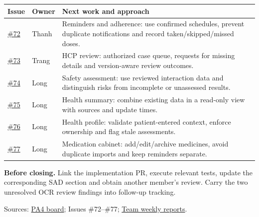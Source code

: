 \documentclass[14pt,a4paper,landscape]{extarticle}
\newcommand{\weekly}{\href{https://docs.google.com/document/d/1hL1-R4h-wUWRMYfatBCGNO-6FeTvV1qBhrAj1i1jbPk/edit}{Team weekly reports}}
\begin{document}
\begin{tabularx}{\linewidth}{@{}p{17mm}p{24mm}X@{}}\toprule
\textbf{Issue} & \textbf{Owner} & \textbf{Next work and approach}\\\midrule
\href{https://github.com/hyt2434/Medical_Safety_Assistant/issues/72}{\#72} & Thanh & Reminders and adherence: use confirmed schedules, prevent duplicate notifications and record taken/skipped/missed doses.\\
\href{https://github.com/hyt2434/Medical_Safety_Assistant/issues/73}{\#73} & Trang & HCP review: authorized case queue, requests for missing details and version-aware review outcomes.\\
\href{https://github.com/hyt2434/Medical_Safety_Assistant/issues/74}{\#74} & Long & Safety assessment: use reviewed interaction data and distinguish risks from incomplete or unassessed results.\\
\href{https://github.com/hyt2434/Medical_Safety_Assistant/issues/75}{\#75} & Long & Health summary: combine existing data in a read-only view with sources and update times.\\
\href{https://github.com/hyt2434/Medical_Safety_Assistant/issues/76}{\#76} & Long & Health profile: validate patient-entered context, enforce ownership and flag stale assessments.\\
\href{https://github.com/hyt2434/Medical_Safety_Assistant/issues/77}{\#77} & Long & Medication cabinet: add/edit/archive medicines, avoid duplicate imports and keep reminders separate.\\\bottomrule
\end{tabularx}

\textbf{Before closing.} Link the implementation PR, execute relevant tests, update the corresponding SAD section and obtain another member's review. Carry the two unresolved OCR review findings into follow-up tracking.

{\small Sources: \href{https://github.com/users/hyt2434/projects/3/views/1?filterQuery=PA4}{PA4 board}; Issues \#72--\#77; \weekly.}
\end{document}
